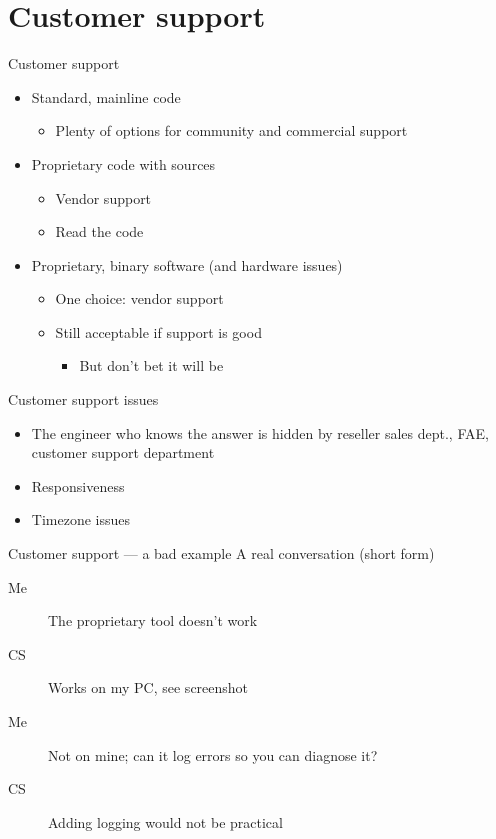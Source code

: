 \documentclass[xetex,table]{beamer}
\begin{document}
\section{Customer support}

\begin{frame}{Customer support}
  \begin{itemize}
  \item Standard, mainline code
    \begin{itemize}
    \item Plenty of options for community and commercial support
    \end{itemize}
  \item Proprietary code with sources
    \begin{itemize}
    \item Vendor support
    \item Read the code
    \end{itemize}
  \item Proprietary, binary software (and hardware issues)
    \begin{itemize}
    \item One choice: vendor support
    \item Still acceptable if support is good
      \begin{itemize}
        \item But don't bet it will be
      \end{itemize}
    \end{itemize}
  \end{itemize}
\end{frame}

\begin{frame}{Customer support issues}
  \begin{itemize}
  \item The engineer who knows the answer is hidden by reseller
    sales dept., FAE, customer support department
  \item Responsiveness
  \item Timezone issues
  \end{itemize}
\end{frame}

\begin{frame}{Customer support --- a bad example}
  A real conversation (short form)
  \begin{description}
  \item[Me] The proprietary tool doesn't work
  \item[CS] Works on my PC, see screenshot
  \item[Me] Not on mine; can it log errors so you can diagnose it?
  \item[CS] Adding logging would not be practical
  \end{description}
\end{frame}
\end{document}
